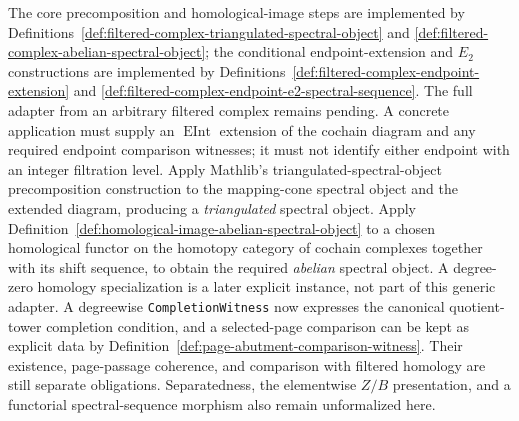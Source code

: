 \begin{definition}
  \label{def:filtered-complex-spectral-object-adapter}
  \notready
  The core precomposition and homological-image steps are implemented by
  Definitions~\ref{def:filtered-complex-triangulated-spectral-object} and
  \ref{def:filtered-complex-abelian-spectral-object}; the conditional
  endpoint-extension and $E_2$ constructions are implemented by
  Definitions~\ref{def:filtered-complex-endpoint-extension} and
  \ref{def:filtered-complex-endpoint-e2-spectral-sequence}.  The full adapter
  from an arbitrary filtered complex remains pending.  A concrete application
  must supply an $\operatorname{EInt}$ extension of the cochain diagram and
  any required endpoint comparison witnesses; it must not identify either
  endpoint with an integer filtration level.  Apply Mathlib's
  triangulated-spectral-object precomposition construction to the mapping-cone
  spectral object and the extended diagram, producing a \emph{triangulated}
  spectral object.  Apply
  Definition~\ref{def:homological-image-abelian-spectral-object} to a chosen
  homological functor on the homotopy category of cochain complexes together
  with its shift sequence, to obtain the required \emph{abelian} spectral
  object.  A degree-zero homology specialization is a later explicit
  instance, not part of this generic adapter.  A
  degreewise \texttt{CompletionWitness} now expresses the canonical
  quotient-tower completion condition, and a selected-page comparison can be
  kept as explicit data by
  Definition~\ref{def:page-abutment-comparison-witness}.  Their existence,
  page-passage coherence, and comparison with filtered homology are still
  separate obligations.  Separatedness, the elementwise $Z/B$ presentation,
  and a functorial spectral-sequence morphism also remain unformalized here.
\end{definition}

